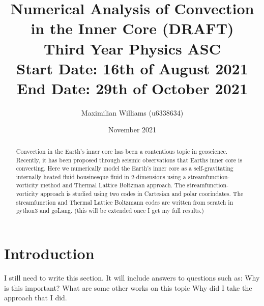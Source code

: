 \documentclass{article}
\title{%
  Numerical Analysis of Convection in the Inner Core (DRAFT) \\
  \large Third Year Physics ASC  \\
    Start Date: 16th of August 2021 End Date: 29th of October 2021}
\author{Maximilian Williams (u6338634)}
\date{November 2021}
\begin{document}
\maketitle

\begin{abstract}
	\noindent Convection in the Earth's inner core has been a contentious topic in geoscience. Recently, it has been proposed through seismic observations that Earths inner core is convecting. Here we numerically model the Earth's inner core as a self-gravitating internally heated fluid bousinesque fluid in 2-dimensions using a streamfunction-vorticity method and Thermal Lattice Boltzman approach. The streamfunction-vorticity approach is studied using two codes in Cartesian and polar coorindates. The streamfunction and Thermal Lattice Boltzmann codes are written from scratch in python3 and goLang.
	(this will be extended once I get my full results.) 
 
\end{abstract}

\section*{Introduction}

I still need to write this section. It will include answers to questions such as: 
\newline
Why is this important?
\newline
What are some other works on this topic
\newline
Why did I take the approach that I did. 
\end{document}
